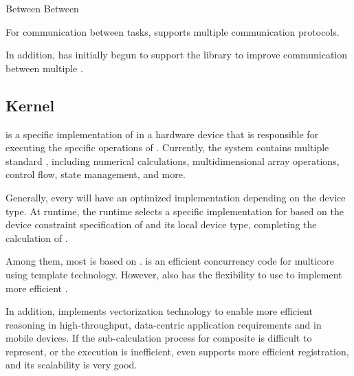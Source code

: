 \begin{content}
\begin{enum}
  Between 
  Between 
\end{enum}

For communication between tasks, \tf{} supports multiple communication protocols.

\begin{enum}
\end{enum}

In addition, \tf{} has initially begun to support the  library to improve communication between multiple .

\subsection{Kernel}

 is a specific implementation of  in a hardware device that is responsible for executing the specific operations of . Currently, the  system contains  multiple standard , including numerical calculations, multidimensional array operations, control flow, state management, and more.

Generally, every  will have an optimized  implementation depending on the device type. At runtime, the runtime selects a specific  implementation for  based on the device constraint specification of  and its local device type, completing the calculation of .

Among them, most  is based on .  is an efficient concurrency code for multicore  using  template technology. However,  also has the flexibility to use  to implement more efficient .

In addition,  implements vectorization technology to enable more efficient reasoning in high-throughput, data-centric application requirements and in mobile devices. If the sub-calculation process for composite  is difficult to represent, or the execution is inefficient,  even supports more efficient  registration, and its scalability is very good.

\end{content}

